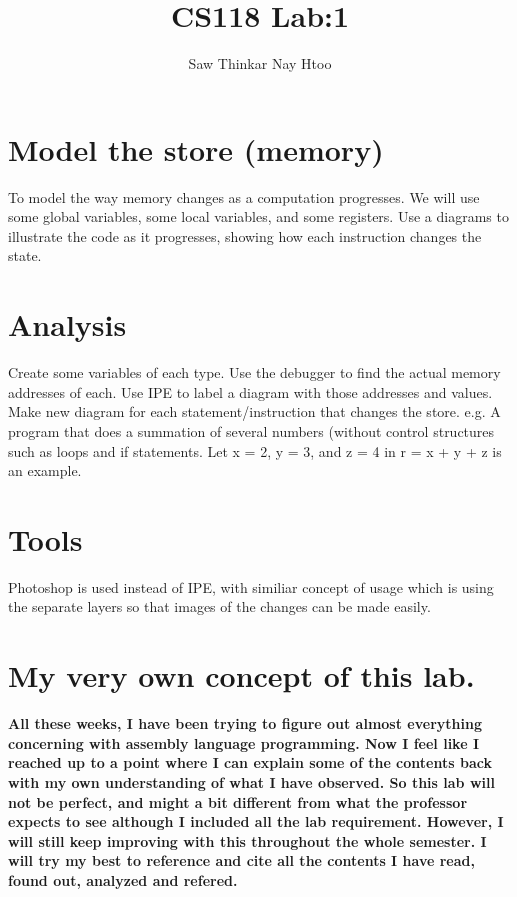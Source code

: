 \documentclass{article}
\begin{document}
\underscoreoff

\title{CS118 Lab:1}
\author{Saw Thinkar Nay Htoo}
\maketitle

\section*{Model the store (memory)}
To model the way memory changes as a computation progresses. We will use some global variables, some local variables, and some registers. Use a diagrams to 
illustrate the code as it progresses, showing how each instruction changes the state. 

\section*{Analysis}
Create some variables of each type. Use the debugger to find the actual memory addresses of each.
Use IPE to label a diagram with those addresses and values. Make new diagram for each statement/instruction that changes the store. 
e.g. A program that does a summation of several numbers (without control structures such as loops and if statements. Let x = 2, y = 3, and z = 4 in r = x + y + z is an example.

\section*{Tools}
Photoshop is used instead of IPE, with similiar concept of usage which is using the separate layers so that images of the changes can be made easily.
\clearpage
\clearpage

\section*{My very own concept of this lab.}
\textbf{All these weeks, I have been trying to figure out almost everything concerning with assembly language programming. Now I feel like I reached up to a point where I can explain some of the contents back with my own understanding of what I have observed. So this lab will not be perfect, and might a bit different from what the professor expects to see although I included all the lab requirement. However, I will still keep improving with this throughout the whole semester. I will try my best to reference and cite all the contents I have read, found out, analyzed and refered.}
\clearpage
\end{document}
